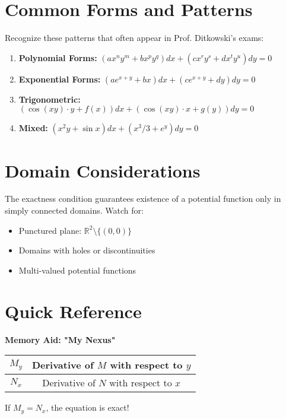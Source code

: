 \documentclass[12pt]{article}
\begin{document}
\section{Common Forms and Patterns}

\begin{examtip}
Recognize these patterns that often appear in Prof. Ditkowski's exams:
\begin{enumerate}
    \item \textbf{Polynomial Forms:} $(ax^ny^m + bx^py^q)dx + (cx^ry^s + dx^ty^u)dy = 0$
    \item \textbf{Exponential Forms:} $(ae^{x+y} + bx)dx + (ce^{x+y} + dy)dy = 0$
    \item \textbf{Trigonometric:} $(\cos(xy) \cdot y + f(x))dx + (\cos(xy) \cdot x + g(y))dy = 0$
    \item \textbf{Mixed:} $(x^2y + \sin x)dx + (x^3/3 + e^y)dy = 0$
\end{enumerate}
\end{examtip}

\section{Domain Considerations}

\begin{warning}
The exactness condition guarantees existence of a potential function only in simply connected domains. Watch for:
\begin{itemize}
    \item Punctured plane: $\mathbb{R}^2 \setminus \{(0,0)\}$
    \item Domains with holes or discontinuities
    \item Multi-valued potential functions
\end{itemize}
\end{warning}

\section{Quick Reference}

\begin{keypoint}
\textbf{Memory Aid: "My Nexus"}
\begin{center}
\begin{tabular}{|c|c|}
\hline
$M_y$ & Derivative of $M$ with respect to $y$ \\
\hline
$N_x$ & Derivative of $N$ with respect to $x$ \\
\hline
\end{tabular}
\end{center}
If $M_y = N_x$, the equation is exact!
\end{keypoint}
\end{document}
